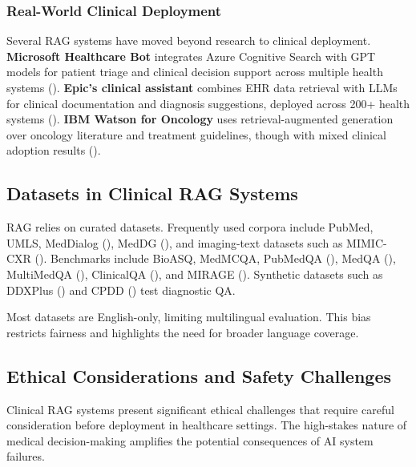 \subsubsection{Real-World Clinical Deployment}
Several RAG systems have moved beyond research to clinical deployment. \textbf{Microsoft Healthcare Bot} integrates Azure Cognitive Search with GPT models for patient triage and clinical decision support across multiple health systems (\citep{microsoft2024healthcare}). \textbf{Epic's clinical assistant} combines EHR data retrieval with LLMs for clinical documentation and diagnosis suggestions, deployed across 200+ health systems (\citep{epic2024rag}). \textbf{IBM Watson for Oncology} uses retrieval-augmented generation over oncology literature and treatment guidelines, though with mixed clinical adoption results (\citep{somashekhar2018watson}).

\subsection{Datasets in Clinical RAG Systems}

RAG relies on curated datasets. Frequently used corpora include PubMed, UMLS, MedDialog (\citep{chen2020meddialog}), MedDG (\citep{li2020meddg}), and imaging-text datasets such as MIMIC-CXR (\citep{johnson2019mimiccxr}). Benchmarks include BioASQ, MedMCQA, PubMedQA (\citep{jin2019pubmedqa}), MedQA (\citep{jin2021medqa}), MultiMedQA (\citep{singhal2023multimedqa}), ClinicalQA (\citep{abacha2021nlmclinicalqa}), and MIRAGE (\citep{zhu2023mirage}). Synthetic datasets such as DDXPlus (\citep{liu2023ddxplus}) and CPDD (\citep{zhao2025medrag}) test diagnostic QA.

Most datasets are English-only, limiting multilingual evaluation. This bias restricts fairness and highlights the need for broader language coverage.

\subsection{Ethical Considerations and Safety Challenges}

Clinical RAG systems present significant ethical challenges that require careful consideration before deployment in healthcare settings. The high-stakes nature of medical decision-making amplifies the potential consequences of AI system failures.

